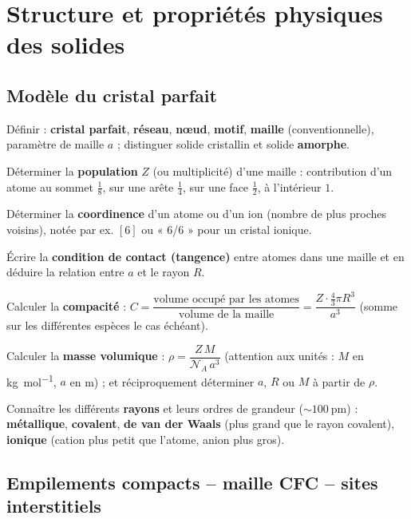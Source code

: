 \documentclass[11pt,a4paper]{article}
\begin{document}
\section{Structure et propriétés physiques des solides}

\subsection{Modèle du cristal parfait}

\begin{savoir}
  \item Définir : \textbf{cristal parfait}, \textbf{réseau}, \textbf{nœud}, \textbf{motif},
        \textbf{maille} (conventionnelle), paramètre de maille $a$ ; distinguer solide
        cristallin et solide \textbf{amorphe}.
  \item Déterminer la \textbf{population} $Z$ (ou multiplicité) d'une maille :
        contribution d'un atome au sommet $\frac18$, sur une arête $\frac14$, sur une face
        $\frac12$, à l'intérieur $1$.
  \item Déterminer la \textbf{coordinence} d'un atome ou d'un ion (nombre de plus proches voisins),
        notée par ex. $[6]$ ou « 6/6 » pour un cristal ionique.
  \item Écrire la \textbf{condition de contact (tangence)} entre atomes dans une maille et en
        déduire la relation entre $a$ et le rayon $R$.
  \item Calculer la \textbf{compacité} :
        $C = \dfrac{\text{volume occupé par les atomes}}{\text{volume de la maille}}
        = \dfrac{Z\cdot\frac43\pi R^3}{a^3}$ (somme sur les différentes espèces le cas échéant).
  \item Calculer la \textbf{masse volumique} : $\rho = \dfrac{Z\,M}{\mathcal{N}_A\,a^3}$
        (attention aux unités : $M$ en \si{\kilo\gram\per\mol}, $a$ en \si{\metre}) ; et
        réciproquement déterminer $a$, $R$ ou $M$ à partir de $\rho$.
  \item Connaître les différents \textbf{rayons} et leurs ordres de grandeur
        ($\sim\SI{100}{\pico\metre}$) : \textbf{métallique}, \textbf{covalent},
        \textbf{de van der Waals} (plus grand que le rayon covalent), \textbf{ionique}
        (cation plus petit que l'atome, anion plus gros).
\end{savoir}

\subsection{Empilements compacts -- maille CFC -- sites interstitiels}
\end{document}
